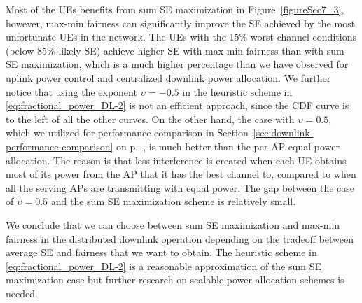 Most of the UEs benefits from sum SE maximization in Figure~\ref{figureSec7_3}, however, max-min fairness can significantly improve the SE achieved by the most unfortunate UEs in the network. The UEs with the 15\% worst channel conditions (below 85\% likely SE) achieve higher SE with max-min fairness than with sum SE maximization, which is a much higher percentage than we have observed for uplink power control and centralized downlink power allocation.
We further notice that using the exponent $\upsilon=-0.5$ in the heuristic scheme in \eqref{eq:fractional_power_DL-2} is not an efficient approach, since the CDF curve is to the left of all the other curves. On the other hand, the case with $\upsilon=0.5$, which we utilized for performance comparison in Section~\ref{sec:downlink-performance-comparison} on p.~\pageref{sec:downlink-performance-comparison}, is much better than the per-AP equal power allocation. The reason is that less interference is created when each UE obtains most of its power from the AP that it has the best channel to, compared to when all the serving APs are transmitting with equal power. The gap between the case of $\upsilon=0.5$ and the sum SE maximization scheme is relatively small. 

We conclude that we can choose between sum SE maximization and max-min fairness in the distributed downlink operation depending on the tradeoff between average SE and fairness that we want to obtain. The  heuristic scheme in \eqref{eq:fractional_power_DL-2} is a reasonable approximation of the sum SE maximization case but further research on scalable power allocation schemes is needed.



